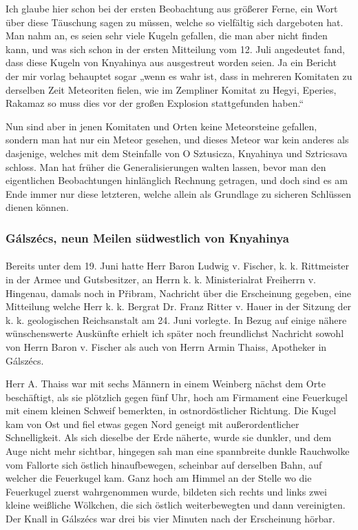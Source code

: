 \documentclass[a4paper, 11pt, oneside, german]{article}
\begin{document}
Ich glaube hier schon bei der ersten Beobachtung aus größerer Ferne, ein Wort über diese Täuschung sagen zu müssen, welche so vielfältig sich dargeboten hat. Man nahm an, es seien sehr viele Kugeln gefallen, die man aber nicht finden kann, und was sich schon in der ersten Mitteilung vom 12. Juli angedeutet fand, dass diese Kugeln von Knyahinya aus ausgestreut worden seien. Ja ein Bericht der mir vorlag behauptet sogar „wenn es wahr ist, dass in mehreren Komitaten zu derselben Zeit Meteoriten fielen, wie im Zempliner Komitat zu Hegyi, Eperies, Rakamaz so muss dies vor der großen Explosion stattgefunden haben.“

Nun sind aber in jenen Komitaten und Orten keine Meteorsteine gefallen, sondern man hat nur ein Meteor gesehen, und dieses Meteor war kein anderes als dasjenige, welches mit dem Steinfalle von O Sztusicza, Knyahinya und Sztricsava schloss. Man hat früher die Generalisierungen walten lassen, bevor man den eigentlichen Beobachtungen hinlänglich Rechnung getragen, und doch sind es am Ende immer nur diese letzteren, welche allein als Grundlage zu sicheren Schlüssen dienen können.
\clearpage
\subsubsection{Gálszécs, neun Meilen südwestlich von Knyahinya}
\paragraph{}
Bereits unter dem 19. Juni hatte Herr Baron Ludwig v. Fischer, k. k. Rittmeister in der Armee und Gutsbesitzer, an Herrn k. k. Ministerialrat Freiherrn v. Hingenau, damals noch in Přibram, Nachricht über die Erscheinung gegeben, eine Mitteilung welche Herr k. k. Bergrat Dr. Franz Ritter v. Hauer in der Sitzung der k. k. geologischen Reichsanstalt am 24. Juni vorlegte. In Bezug auf einige nähere wünschenswerte Auskünfte erhielt ich später noch freundlichst Nachricht sowohl von Herrn Baron v. Fischer als auch von Herrn Armin Thaiss, Apotheker in Gálszécs.

Herr A. Thaiss war mit sechs Männern in einem Weinberg nächst dem Orte beschäftigt, als sie plötzlich gegen fünf Uhr, hoch am Firmament eine Feuerkugel mit einem kleinen Schweif bemerkten, in ostnordöstlicher Richtung. Die Kugel kam von Ost und fiel etwas gegen Nord geneigt mit außerordentlicher Schnelligkeit. Als sich dieselbe der Erde näherte, wurde sie dunkler, und dem Auge nicht mehr sichtbar, hingegen sah man eine spannbreite dunkle Rauchwolke vom Fallorte sich östlich hinaufbewegen, scheinbar auf derselben Bahn, auf welcher die Feuerkugel kam. Ganz hoch am Himmel an der Stelle wo die Feuerkugel zuerst wahrgenommen wurde, bildeten sich rechts und links zwei kleine weißliche Wölkchen, die sich östlich weiterbewegten und dann vereinigten. Der Knall in Gálszécs war drei bis vier Minuten nach der Erscheinung hörbar.
\end{document}
